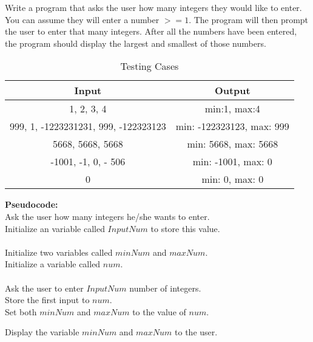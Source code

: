 \documentclass[11pt]{article}
\newenvironment{exercise}[2]{\begin{trivlist}
\item[\hskip \labelsep {\bfseries #1}\hskip \labelsep {\bfseries #2.}]}{\end{trivlist}}
\begin{document}
\begin{exercise}{3A}\\
Write a program that asks the user how many integers they would like to enter.
You can assume they will enter a number $>= 1$.
The program will then prompt the user to enter that many integers.
After all the numbers have been entered,
the program should display the largest and smallest of those numbers.\\
\begin{table}[H]
\centering
\caption*{Testing Cases}
\label{my-label}
\begin{tabular}{|c|c|}
\hline
Input & Output  \\
\hline
1, 2, 3, 4  &  min:1, max:4 \\
\hline
999, 1, -1223231231, 999, -122323123 & min: -122323123, max: 999 \\
\hline
5668, 5668, 5668 & min: 5668, max: 5668 \\
\hline
-1001, -1, 0, - 506 & min: -1001, max: 0\\
\hline
0 & min: 0, max: 0\\
\hline
\end{tabular}
\end{table}
\noindent
\textbf{Pseudocode:}\\
Ask the user how many integers he/she wants to enter.\\
Initialize an variable called $InputNum$ to store this value.\\
\\
Initialize two variables called $minNum$ and $maxNum$.\\
Initialize a variable called $num$.\\
\\
Ask the user to enter $InputNum$ number of integers.\\
Store the first input to $num$.\\
Set both $minNum$ and $maxNum$ to the value of $num$.\\

\begin{algorithmic}[H]

    \ENDIF
    \ENDFOR
\end{algorithmic}
Display the variable $minNum$ and $maxNum$ to the user.
\end{exercise}
\end{document}

